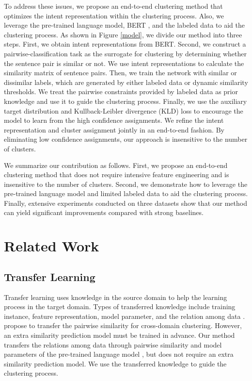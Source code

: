 \documentclass[letterpaper]{article} \usepackage{aaai20}  \usepackage{times}  \usepackage{helvet} \usepackage{courier}  \usepackage[hyphens]{url}  \usepackage{graphicx} \urlstyle{rm} \def\UrlFont{\rm}  \usepackage{graphicx}  \frenchspacing  \setlength{\pdfpagewidth}{8.5in}  \setlength{\pdfpageheight}{11in}
\newcommand{\citet}[1]{\citeauthor{#1} \shortcite{#1}}
\newcommand{\citep}{\cite}
\begin{document}
To address these issues, we propose an end-to-end clustering method that optimizes the intent representation within the clustering process. Also, we leverage the pre-trained language model, BERT \citep{devlin2018bert}, and the labeled data to aid the clustering process. As shown in Figure \ref{model}, we divide our method into three steps. First, we obtain intent representations from BERT. Second, we construct a pairwise-classification task as the surrogate for clustering by determining whether the sentence pair is similar or not. We use intent representations to calculate the similarity matrix of sentence pairs. Then, we train the network with similar or dissimilar labels, which are generated by either labeled data or dynamic similarity thresholds. We treat the pairwise constraints provided by labeled data as prior knowledge and use it to guide the clustering process. Finally, we use the auxiliary target distribution and Kullback-Leibler divergence (KLD) loss to encourage the model to learn from the high confidence assignments. We refine the intent representation and cluster assignment jointly in an end-to-end fashion. By eliminating low confidence assignments, our approach is insensitive to the number of clusters.

We summarize our contribution as follows. First, we propose an end-to-end clustering method that does not require intensive feature engineering and is insensitive to the number of clusters. Second, we demonstrate how to leverage the pre-trained language model and limited labeled data to aid the clustering process. Finally, extensive experiments conducted on three datasets show that our method can yield significant improvements compared with strong baselines.

\section{Related Work}
\subsection{Transfer Learning} 
Transfer learning uses knowledge in the source domain to help the learning process in the target domain. Types of transferred knowledge include training instance, feature representation, model parameter, and the relation among data \cite{Pan2010}. \citet{hsu2018learning} propose to transfer the pairwise similarity for cross-domain clustering. However, an extra similarity prediction model must be trained in advance. Our method transfers the relations among data through pairwise similarity and model parameters of the pre-trained language model \cite{devlin2018bert}, but does not require an extra similarity prediction model. We use the transferred knowledge to guide the clustering process. 
\end{document}
